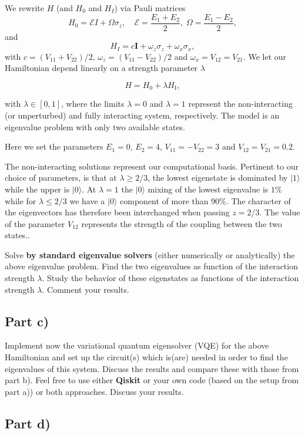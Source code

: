 \documentclass[%
oneside,                 %
final,                   %
10pt]{article}
\begin{document}
We rewrite $H$ (and $H_0$ and $H_I$)  via Pauli matrices
\[
H_0 = \mathcal{E} I + \Omega \sigma_z, \quad \mathcal{E} = \frac{E_1
  + E_2}{2}, \; \Omega = \frac{E_1-E_2}{2},
\]
and
\[
H_I = c \bm{I} +\omega_z\sigma_z + \omega_x\sigma_x,
\]
with $c = (V_{11}+V_{22})/2$, $\omega_z = (V_{11}-V_{22})/2$ and $\omega_x = V_{12}=V_{21}$.
We let our Hamiltonian depend linearly on a strength parameter $\lambda$

\[
H=H_0+\lambda H_\mathrm{I},
\]

with $\lambda \in [0,1]$, where the limits $\lambda=0$ and $\lambda=1$
represent the non-interacting (or unperturbed) and fully interacting
system, respectively.  The model is an eigenvalue problem with only
two available states.

Here we set the parameters $E_1=0$,
$E_2=4$, $V_{11}=-V_{22}=3$ and $V_{12}=V_{21}=0.2$.

The non-interacting solutions represent our computational basis.
Pertinent to our choice of parameters, is that at $\lambda\geq 2/3$,
the lowest eigenstate is dominated by $\vert 1\rangle$ while the upper
is $\vert 0 \rangle$. At $\lambda=1$ the $\vert 0 \rangle$ mixing of
the lowest eigenvalue is $1\%$ while for $\lambda\leq 2/3$ we have a
$\vert 0 \rangle$ component of more than $90\%$.  The character of the
eigenvectors has therefore been interchanged when passing $z=2/3$. The
value of the parameter $V_{12}$ represents the strength of the coupling
between the two states..

Solve \textbf{by standard eigenvalue solvers} (either numerically or analytically) the above eigenvalue problem.
Find the two eigenvalues as function of the interaction strength $\lambda$.
Study the behavior of these eigenstates as functions of the interaction strength $\lambda$.
Comment your results.

\subsection*{Part c)}

Implement now the variational quantum eigensolver (VQE) for the above
Hamiltonian and set up the circuit(s) which is(are) needed in order to find
the eigenvalues of this system. Discuss the results and compare these
with those from part b). Feel free to use either \textbf{Qiskit} or your own
code (based on the setup from part a)) or both approaches. Discuss
your results.

\subsection*{Part d)}
\end{document}
